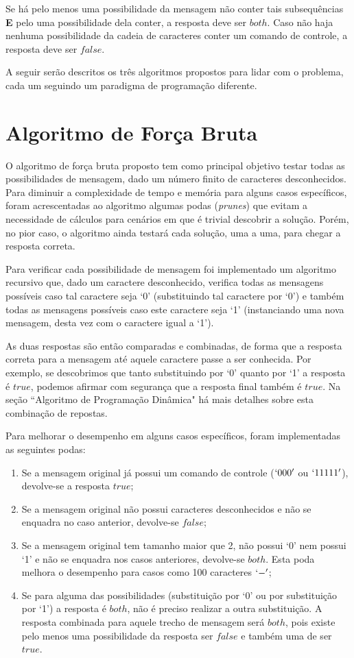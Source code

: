 \documentclass[a4paper,12pt,titlepage]{article}
\begin{document}
Se há pelo menos uma possibilidade da mensagem não conter tais subsequências \textbf{E} pelo uma possibilidade dela conter, a resposta deve ser $both$. Caso não haja nenhuma possibilidade da cadeia de caracteres conter um comando de controle, a resposta deve ser $false$.

A seguir serão descritos os três algoritmos propostos para lidar com o problema, cada um seguindo um paradigma de programação diferente.

\section{Algoritmo de Força Bruta}

O algoritmo de força bruta proposto tem como principal objetivo testar todas as possibilidades de mensagem, dado um número finito de caracteres desconhecidos. Para diminuir a complexidade de tempo e memória para alguns casos específicos, foram acrescentadas ao algoritmo algumas podas (\textit{prunes}) que evitam a necessidade de cálculos para cenários em que é trivial descobrir a solução. Porém, no pior caso, o algoritmo ainda testará cada solução, uma a uma, para chegar a resposta correta.

Para verificar cada possibilidade de mensagem foi implementado um algoritmo recursivo que, dado um caractere desconhecido, verifica todas as mensagens possíveis caso tal caractere seja `0' (substituindo tal caractere por `0') e também todas as mensagens possíveis caso este caractere seja `1' (instanciando uma nova mensagem, desta vez com o caractere igual a `1').

As duas respostas são então comparadas e combinadas, de forma que a resposta correta para a mensagem até aquele caractere passe a ser conhecida. Por exemplo, se descobrimos que tanto substituindo por `0' quanto por `1' a resposta é $true$, podemos afirmar com segurança que a resposta final também é $true$. Na seção ``Algoritmo de Programação Dinâmica" há mais detalhes sobre esta combinação de repostas.

Para melhorar o desempenho em alguns casos específicos, foram implementadas as seguintes podas:

\begin{enumerate}[leftmargin=1.5cm]
    \item Se a mensagem original já possui um comando de controle ($`000'$ ou $`11111'$), devolve-se a resposta $true$;  
    \item Se a mensagem original não possui caracteres desconhecidos e não se enquadra no caso anterior, devolve-se $false$;
    \item Se a mensagem original tem tamanho maior que 2, não possui `0' nem possui `1' e não se enquadra nos casos anteriores, devolve-se $both$. Esta poda melhora o desempenho para casos como 100 caracteres $`-'$;
    \item Se para alguma das possibilidades (substituição por `0' ou por substituição por `1') a resposta é $both$, não é preciso realizar a outra substituição. A resposta combinada para aquele trecho de mensagem será $both$, pois existe pelo menos uma possibilidade da resposta ser $false$ e também uma de ser $true$.
\end{enumerate}
\end{document}
